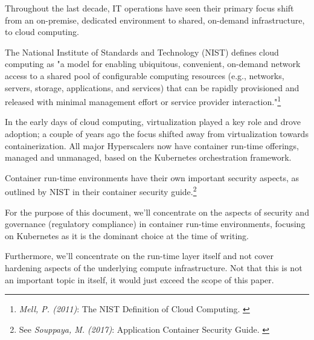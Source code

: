 Throughout the last decade, IT operations have seen their primary focus shift from an on-premise, dedicated environment to shared, on-demand infrastructure, to cloud computing.

The National Institute of Standards and Technology (NIST) defines cloud computing as "a model for enabling ubiquitous, convenient, on-demand network access to a shared pool of configurable computing resources (e.g., networks, servers, storage, applications, and services) that can be rapidly provisioned and released with minimal management effort or service provider interaction."\footnote{\textit{Mell, P. (2011)}: The NIST Definition of Cloud Computing. \cite{sp800-145}}

In the early days of cloud computing, virtualization played a key role and drove adoption; a couple of years ago the focus shifted away from virtualization towards containerization. All major Hyperscalers now have container run-time offerings, managed and unmanaged, based on the Kubernetes orchestration framework.

Container run-time environments have their own important security aspects, as outlined by NIST in their container security guide.\footnote{See \textit{Souppaya, M. (2017)}: Application Container Security Guide. \cite{sp800-190}}

For the purpose of this document, we'll concentrate on the aspects of security and governance (regulatory compliance) in container run-time environments, focusing on Kubernetes as it is the dominant choice at the time of writing.

Furthermore, we'll concentrate on the run-time layer itself and not cover hardening aspects of the underlying compute infrastructure. Not that this is not an important topic in itself, it would just exceed the scope of this paper.
